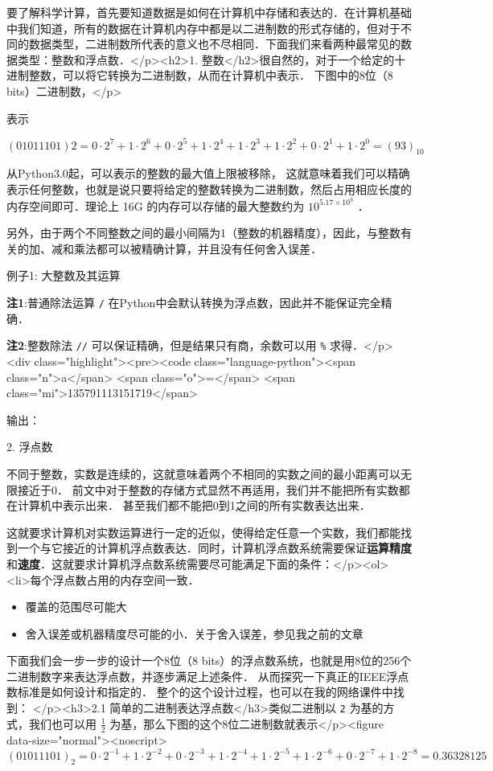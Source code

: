 

要了解科学计算，首先要知道数据是如何在计算机中存储和表达的．在计算机基础中我们知道，所有的数据在计算机内存中都是以二进制数的形式存储的，但对于不同的数据类型，二进制数所代表的意义也不尽相同．下面我们来看两种最常见的数据类型：整数和浮点数．</p><h2>1. 整数</h2>很自然的，对于一个给定的十进制整数，可以将它转换为二进制数，从而在计算机中表示． 下图中的8位（8 bits）二进制数，</p>

表示

 $(01011101)2=0\cdot2^7+1\cdot2^6+0\cdot2^5+1\cdot2^4+1\cdot2^3+1\cdot2^2+0\cdot2^1+1\cdot2^0=(93)_{10}$  

从Python3.0起，可以表示的整数的最大值上限被移除， 这就意味着我们可以精确表示任何整数，也就是说只要将给定的整数转换为二进制数，然后占用相应长度的内存空间即可．理论上 16G 的内存可以存储的最大整数约为  $10^{5.17\times10^9}$  ．

另外，由于两个不同整数之间的最小间隔为1（整数的机器精度），因此，与整数有关的加、减和乘法都可以被精确计算，并且没有任何舍入误差．

例子1: 大整数及其运算

\textbf{注1}:普通除法运算  \verb|/|  在Python中会默认转换为浮点数，因此并不能保证完全精确．

\textbf{注2}:整数除法 \verb|//| 可以保证精确，但是结果只有商，余数可以用 \verb|%|  求得．</p><div class="highlight"><pre><code class="language-python"><span class="n">a</span> <span class="o">=</span> <span class="mi">135791113151719</span>


输出：

2. 浮点数

不同于整数，实数是连续的，这就意味着两个不相同的实数之间的最小距离可以无限接近于0． 前文中对于整数的存储方式显然不再适用，我们并不能把所有实数都在计算机中表示出来． 甚至我们都不能把0到1之间的所有实数表达出来．

这就要求计算机对实数运算进行一定的近似，使得给定任意一个实数，我们都能找到一个与它接近的计算机浮点数表达．同时，计算机浮点数系统需要保证\textbf{运算精度}和\textbf{速度}．这就要求计算机浮点数系统需要尽可能满足下面的条件：</p><ol><li>每个浮点数占用的内存空间一致．

\begin{itemize}
\item 覆盖的范围尽可能大
\item 舍入误差或机器精度尽可能的小．关于舍入误差，参见我之前的文章
\end{itemize}

下面我们会一步一步的设计一个8位（8 bits）的浮点数系统，也就是用8位的256个二进制数字来表达浮点数，并逐步满足上述条件． 从而探究一下真正的IEEE浮点数标准是如何设计和指定的． 整个的这个设计过程，也可以在我的网络课件中找到： </p><h3>2.1 简单的二进制表达浮点数</h3>类似二进制以 \verb|2| 为基的方式，我们也可以用  $\frac{1}{2}$  为基，那么下图的这个8位二进制数就表示</p><figure data-size="normal"><noscript> $(01011101)_2=0\cdot2^{-1}+1\cdot2^{-2}+0\cdot2^{-3}+1\cdot2^{-4}+1\cdot2^{-5}+1\cdot2^{-6}+0\cdot2^{-7}+1\cdot2^{-8}=0.36328125$  


